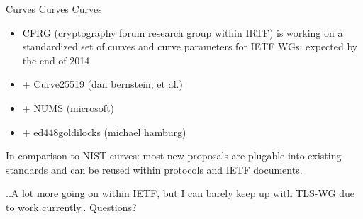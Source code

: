 \begin{frame}{Curves Curves Curves}
  \begin{itemize}
    \item CFRG (cryptography forum research group within IRTF) is working on a standardized set of curves and curve parameters for IETF WGs: expected by the end of 2014
    \item + Curve25519 (dan bernstein, et al.)
    \item + NUMS (microsoft)
    \item + ed448goldilocks (michael hamburg)
  \end{itemize}
In comparison to NIST curves: most new proposals are plugable into existing standards and can be reused within protocols and IETF documents.
\end{frame}

\begin{frame}
..A lot more going on within IETF, but I can barely keep up with TLS-WG due to work currently..
\newline
\newline
Questions?
\end{frame}
